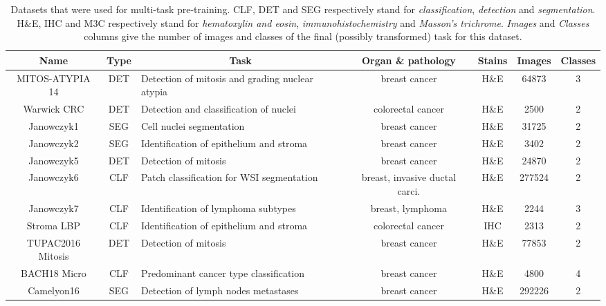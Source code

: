 \begin{table*}[t]
    \centering
    \caption{Datasets that were used for multi-task pre-training. CLF, DET and SEG respectively stand for \textit{classification}, \textit{detection} and \textit{segmentation}. H\&E, IHC and M3C respectively stand for \textit{hematoxylin and eosin}, \textit{immunohistochemistry} and \textit{Masson's trichrome}. \textit{Images} and \textit{Classes} columns give the number of images and classes of the final (possibly transformed) task for this dataset.} 
    \label{tab:mtask:datasets}
    \begin{tabular}{|c|c|l|c|c|c|c|}
        \hline
        \textbf{Name} & Type & \multicolumn{1}{c|}{Task} & Organ \& pathology & Stains & Images & Classes \\
        \hline
MITOS-ATYPIA 14 \parencite{roux2014mitos}  & DET &  Detection of mitosis and grading nuclear atypia & breast cancer & H\&E & 64873 & 3 \\
Warwick CRC \parencite{sirinukunwattana2016locality}  & DET &  Detection and classification of nuclei & colorectal cancer & H\&E & 2500 & 2 \\
Janowczyk1 \parencite{janowczyk2016deep}  & SEG &  Cell nuclei segmentation & breast cancer & H\&E & 31725 & 2 \\
Janowczyk2 \parencite{janowczyk2016deep}  & SEG &  Identification of epithelium and stroma & breast cancer & H\&E & 3402 & 2 \\
Janowczyk5 \parencite{janowczyk2016deep}  & DET &  Detection of mitosis & breast cancer & H\&E & 24870 & 2 \\
Janowczyk6 \parencite{janowczyk2016deep}  & CLF &  Patch classification for WSI segmentation & breast, invasive ductal carci. & H\&E & 277524 & 2 \\
Janowczyk7 \parencite{janowczyk2016deep}  & CLF &  Identification of lymphoma subtypes & breast, lymphoma & H\&E & 2244 & 3 \\
Stroma LBP \parencite{linder2012identification}  & CLF &  Identification of epithelium and stroma & colorectal cancer & IHC & 2313 & 2 \\
TUPAC2016 Mitosis \parencite{veta2019predicting}  & DET &  Detection of mitosis & breast cancer & H\&E & 77853 & 2 \\
BACH18 Micro \parencite{aresta2019bach}  & CLF &  Predominant cancer type classification & breast cancer & H\&E & 4800 & 4 \\ 
Camelyon16 \parencite{bejnordi2017diagnostic}  & SEG &  Detection of lymph nodes metastases & breast cancer & H\&E & 292226 & 2 \\

\end{tabular}
\end{table*}
